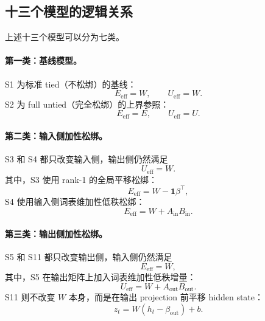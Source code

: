 \subsection{十三个模型的逻辑关系}

上述十三个模型可以分为七类。

\paragraph{第一类：基线模型。}
S1 为标准 tied（不松绑）的基线：
\begin{equation}
    E_{\mathrm{eff}} = W, \qquad
    U_{\mathrm{eff}} = W.
\end{equation}
S2 为 full untied（完全松绑）的上界参照：
\begin{equation}
    E_{\mathrm{eff}} = E, \qquad
    U_{\mathrm{eff}} = U.
\end{equation}

\paragraph{第二类：输入侧加性松绑。}
S3 和 S4 都只改变输入侧，输出侧仍然满足
\begin{equation}
    U_{\mathrm{eff}} = W.
\end{equation}
其中，S3 使用 rank-1 的全局平移松绑：
\begin{equation}
    E_{\mathrm{eff}} = W-\mathbf{1}\beta^\top,
\end{equation}
S4 使用输入侧词表维加性低秩松绑：
\begin{equation}
    E_{\mathrm{eff}} = W+A_{\mathrm{in}}B_{\mathrm{in}}.
\end{equation}

\paragraph{第三类：输出侧加性松绑。}
S5 和 S11 都只改变输出侧，输入侧仍然满足
\begin{equation}
    E_{\mathrm{eff}} = W,
\end{equation}
其中，S5 在输出矩阵上加入词表维加性低秩增量：
\begin{equation}
    U_{\mathrm{eff}} = W+A_{\mathrm{out}}B_{\mathrm{out}}.
\end{equation}
S11 则不改变 $W$ 本身，而是在输出 projection 前平移 hidden state：
\begin{equation}
    z_t = W(h_t-\beta_{\mathrm{out}})+b.
\end{equation}

